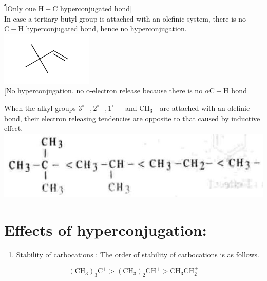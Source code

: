 \documentclass[10pt]{article}
\begin{document}
โOnly oue $\mathrm{H}-\mathrm{C}$ hyperconjugated hond|\\
In case a tertiary butyl group is attached with an olefinic system, there is no $\mathrm{C}-\mathrm{H}$ hyperconjugated bond, hence no hyperconjugation.\\
\includegraphics{smile-8eed1a2f4becc9d61c573977cc8e1e4885a1ada7}\\[0pt]
[No hyperconjugation, no o-electron release because there is no $\alpha \mathrm{C}-\mathrm{H}$ bond

When the alkyl groups $3^{\circ}-, 2^{\circ}-, 1^{\circ}-$ and $\mathrm{CH}_{3}$ - are attached with an olefinic bond, their electron releasing tendencies are opposite to that caused by inductive effect.\\
\includegraphics[max width=\textwidth, center]{2025_01_28_8470952b98110cec3aabg-081(2)}

\section*{Effects of hyperconjugation:}
\begin{enumerate}
  \item Stability of carbocations : The order of stability of carbocations is as follows.
\end{enumerate}

$$
\left(\mathrm{CH}_{3}\right)_{3} \mathrm{C}^{+}>\left(\mathrm{CH}_{3}\right)_{2} \mathrm{CH}^{+}>\mathrm{CH}_{3} \mathrm{CH}_{2}^{+}
$$
\end{document}
